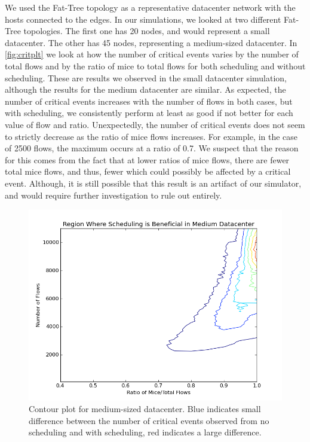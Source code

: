 We used the Fat-Tree topology \cite{fattree} as a representative datacenter
network with the hosts connected to the edges. In our simulations, we looked at
two different Fat-Tree topologies. The first one has 20 nodes, and
would represent a small datacenter. The other has 45 nodes, representing a
medium-sized datacenter. In \ref{fig:critplt} we look at how the
number of critical events varies by the number of total flows and by the ratio
of mice to total flows for both scheduling and without scheduling. These are
results we observed in the small datacenter simulation, although the results
for the medium datacenter are similar. As expected, the number of critical events
increases with the number of flows in both cases, but with scheduling, we 
consistently perform at least as good if not better for each value of flow and
ratio. Unexpectedly, the number of critical events does not seem to strictly
decrease as the ratio of mice flows increases. For example, in the case of 2500
flows, the maximum occurs at a ratio of 0.7. We suspect that the reason for this
comes from the fact that at lower ratios of mice flows, there are fewer total
mice flows, and thus, fewer which could possibly be affected by a critical
event. Although, it is still possible that this result is an artifact of our
simulator, and would require further investigation to rule out entirely.
\begin{figure}
	\centering
	\includegraphics[width=\columnwidth]{large_datacenter.png}
	\caption{Contour plot for medium-sized datacenter. Blue indicates small
    difference between the number of critical events observed from no
    scheduling and with scheduling, red indicates a large difference.}
	\label{fig:largedc}
\end{figure}

